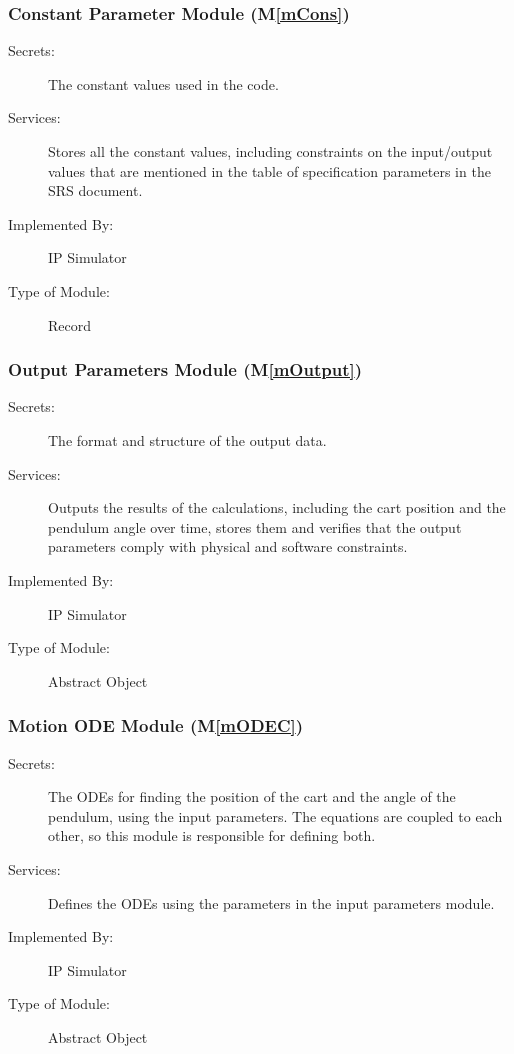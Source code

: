 \documentclass[12pt, titlepage]{article}
\newcommand{\mref}[1]{M\ref{#1}}
\begin{document}
\subsubsection{Constant Parameter Module (\mref{mCons})}
\begin{description}
\item[Secrets:] The constant values used in the code.
\item[Services:] Stores all the constant values, including constraints on the input/output values that are mentioned in the table of specification parameters in the SRS document.

\item[Implemented By:] IP Simulator
\item[Type of Module:] Record
\end{description} 
\subsubsection{Output Parameters Module (\mref{mOutput})}

\begin{description}
\item[Secrets:] The format and structure of the output data.
\item[Services:] Outputs the results of the calculations, including the cart position and the pendulum angle over time, stores them and verifies that the output parameters comply with physical and software constraints.
\item[Implemented By:] IP Simulator
\item[Type of Module:] Abstract Object
\end{description} 




\subsubsection{Motion ODE  Module (\mref{mODEC})}

\begin{description}
\item[Secrets:] The ODEs for finding the position of the cart and  the angle of the pendulum, using the input parameters. The equations are coupled to each other, so this module is responsible for defining both.
\item[Services:] Defines the ODEs using the parameters in the input parameters module.

\item[Implemented By:] IP Simulator
\item[Type of Module:] Abstract Object
\end{description} 
\end{document}
